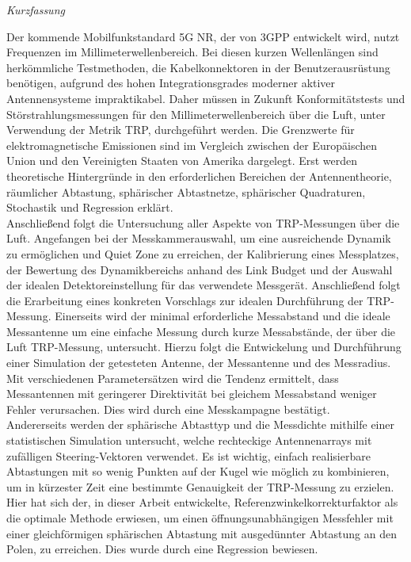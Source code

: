 

\newpage
\thispagestyle{empty}
\begin{center}
\Huge\emph{Kurzfassung}
\end{center}
\medskip
\noindent

Der kommende Mobilfunkstandard 5G NR, der von 3GPP entwickelt wird, nutzt Frequenzen im Millimeterwellenbereich.
Bei diesen kurzen Wellenlängen sind herkömmliche Testmethoden, die Kabelkonnektoren in der Benutzerausrüstung benötigen, aufgrund des hohen Integrationsgrades moderner aktiver Antennensysteme impraktikabel.
Daher müssen in Zukunft Konformitätstests und Störstrahlungsmessungen für den Millimeterwellenbereich über die Luft, unter Verwendung der Metrik TRP, durchgeführt werden.
Die Grenzwerte für elektromagnetische Emissionen sind im Vergleich zwischen der Europäischen Union und den Vereinigten Staaten von Amerika dargelegt.
Erst werden theoretische Hintergründe in den erforderlichen Bereichen der Antennentheorie, räumlicher Abtastung, sphärischer Abtastnetze, sphärischer Quadraturen, Stochastik und Regression erklärt.\\

Anschließend folgt die Untersuchung aller Aspekte von TRP-Messungen über die Luft.
Angefangen bei der Messkammerauswahl, um eine ausreichende Dynamik zu ermöglichen und Quiet Zone zu erreichen, der Kalibrierung eines Messplatzes, der Bewertung des Dynamikbereichs anhand des Link Budget und der Auswahl der idealen Detektoreinstellung für das verwendete Messgerät.
Anschließend folgt die Erarbeitung eines konkreten Vorschlags zur idealen Durchführung der TRP-Messung.
Einerseits wird der minimal erforderliche Messabstand und die ideale Messantenne um eine einfache Messung durch kurze Messabstände, der über die Luft TRP-Messung, untersucht.
Hierzu folgt die Entwickelung und Durchführung einer Simulation der getesteten Antenne, der Messantenne und des Messradius.
Mit verschiedenen Parametersätzen wird die Tendenz ermittelt, dass Messantennen mit geringerer Direktivität bei gleichem Messabstand weniger Fehler verursachen. Dies wird durch eine Messkampagne bestätigt.\\

Andererseits werden der sphärische Abtasttyp und die Messdichte mithilfe einer statistischen Simulation untersucht, welche rechteckige Antennenarrays mit zufälligen Steering-Vektoren verwendet.
Es ist wichtig, einfach realisierbare Abtastungen mit so wenig Punkten auf der Kugel wie möglich zu kombinieren, um in kürzester Zeit eine bestimmte Genauigkeit der TRP-Messung zu erzielen.
Hier hat sich der, in dieser Arbeit entwickelte, Referenzwinkelkorrekturfaktor als die optimale Methode erwiesen, um einen öffnungsunabhängigen Messfehler mit einer gleichförmigen sphärischen Abtastung mit ausgedünnter Abtastung an den Polen, zu erreichen.
Dies wurde durch eine Regression bewiesen.

